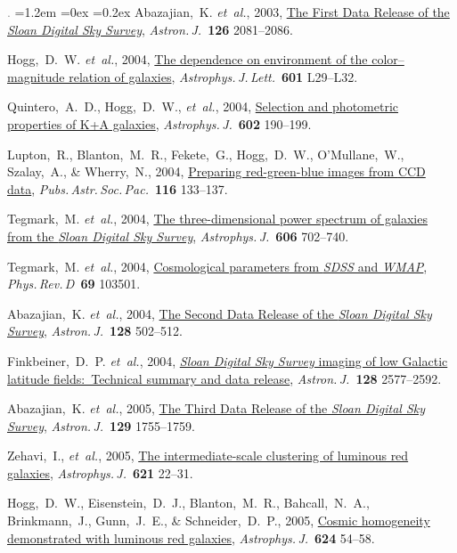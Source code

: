 \documentclass[10pt,letterpaper]{article}
\newcommand{\acronym}[1]{{\small{#1}}}
\newcommand{\foreign}[1]{\textsl{#1}}
\newcommand{\etal}{\foreign{et~al.}}
\newcommand{\project}[1]{\textsl{#1}}
\newcommand{\doi}[2]{\href{http://dx.doi.org/#1}{{#2}}}
\newcommand{\deemph}[1]{\textcolor{grey}{\footnotesize{#1}}}
\newcommand{\pubnumber}[1]{\deemph{{#1}.}}
\newcounter{refpubnum}
\newcommand{\hogglist}{%
    \rightmargin=0in
    \leftmargin=1.2em
    \topsep=0ex
    \partopsep=0pt
    \itemsep=0.2ex
    \parsep=0pt
    \itemindent=-1.0\leftmargin
    \listparindent=0.0\leftmargin
    \settowidth{\labelsep}{~}
    \usecounter{refpubnum}
  }
\begin{document}
\begin{list}{\pubnumber{\therefpubnum}}{\hogglist}
Abazajian,~K. \etal, 2003,
\doi{10.1086/378165}{The First Data Release of the \project{Sloan Digital Sky Survey}},
\textit{Astron.\,J.}\ \textbf{126} 2081--2086.
\item\label{pub:Hogg2004}
Hogg,~D.~W. \etal, 2004,
\doi{10.1086/381749}{The dependence on environment of the color--magnitude relation of galaxies},
\textit{Astrophys.\,J.\,Lett.}\ \textbf{601} L29--L32.
\item\label{pub:Quintero2004}
Quintero,~A.~D., Hogg,~D.~W., \etal, 2004,
\doi{10.1086/380601}{Selection and photometric properties of K+A galaxies},
\textit{Astrophys.\,J.}\ \textbf{602} 190--199.
\item
Lupton,~R., Blanton,~M.~R., Fekete,~G., Hogg,~D.~W., O'Mullane,~W., Szalay,~A., \& Wherry,~N., 2004,
\doi{10.1086/382245}{Preparing red-green-blue images from \acronym{CCD} data},
\textit{Pubs.\,Astr.\,Soc.\,Pac.}\ \textbf{116} 133--137.
\item
Tegmark,~M. \etal, 2004,
\doi{10.1086/382125}{The three-dimensional power spectrum of galaxies from the \project{Sloan Digital Sky Survey}},
\textit{Astrophys.\,J.}\ \textbf{606} 702--740.
\item
Tegmark,~M. \etal, 2004,
\doi{10.1103/PhysRevD.69.103501}{Cosmological parameters from \project{\acronym{SDSS}} and \project{\acronym{WMAP}}},
\textit{Phys.\,Rev.\,D}\ \textbf{69} 103501.
\item
Abazajian,~K. \etal, 2004,
\doi{10.1086/421365}{The Second Data Release of the \project{Sloan Digital Sky Survey}},
\textit{Astron.\,J.}\ \textbf{128} 502--512.
\item
Finkbeiner,~D.~P. \etal, 2004,
\doi{10.1086/425050}{\project{Sloan Digital Sky Survey} imaging of low Galactic latitude fields:\ Technical summary and data release},
\textit{Astron.\,J.}\ \textbf{128} 2577--2592.
\item
Abazajian,~K. \etal, 2005,
\doi{10.1086/427544}{The Third Data Release of the \project{Sloan Digital Sky Survey}},
\textit{Astron.\,J.}\ \textbf{129} 1755--1759.
\item
Zehavi,~I., \etal, 2005,
\doi{10.1086/427495}{The intermediate-scale clustering of luminous red galaxies},
\textit{Astrophys.\,J.}\ \textbf{621} 22--31.
\item
Hogg,~D.~W., Eisenstein,~D.~J., Blanton,~M.~R., Bahcall,~N.~A., Brinkmann,~J., Gunn,~J.~E., \& Schneider,~D.~P., 2005,
\doi{10.1086/429084}{Cosmic homogeneity demonstrated with luminous red galaxies},
\textit{Astrophys.\,J.}\ \textbf{624} 54--58.
\item

\end{list}
\end{document}
